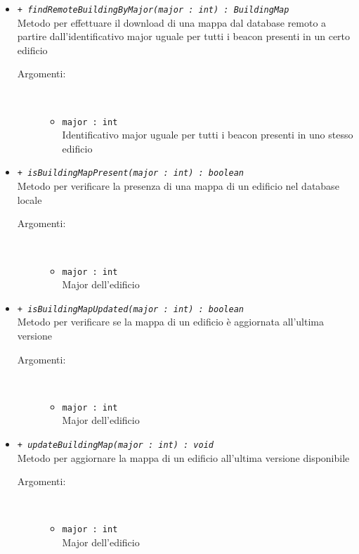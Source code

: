 \documentclass[../DefinizioneDiProdotto.tex]{subfiles}
\begin{document}
\begin{description}
\begin{itemize}
\begin{description}
\end{description}
\item \texttt{+ \textit{findRemoteBuildingByMajor(major : int) : BuildingMap}}\\
Metodo per effettuare il download di una mappa dal database remoto a partire dall'identificativo major uguale per tutti i beacon presenti in un certo edificio
 \begin{description}
\item[Argomenti:] \
\begin{itemize}
\item \texttt{major : int}\\
Identificativo major uguale per tutti i beacon presenti in uno stesso edificio\end{itemize}
\end{description}
\item \texttt{+ \textit{isBuildingMapPresent(major : int) : boolean}}\\
Metodo per verificare la presenza di una mappa di un edificio nel database locale
 \begin{description}
\item[Argomenti:] \
\begin{itemize}
\item \texttt{major : int}\\
Major dell'edificio\end{itemize}
\end{description}
\item \texttt{+ \textit{isBuildingMapUpdated(major : int) : boolean}}\\
Metodo per verificare se la mappa di un edificio è aggiornata all'ultima versione
 \begin{description}
\item[Argomenti:] \
\begin{itemize}
\item \texttt{major : int}\\
Major dell'edificio\end{itemize}
\end{description}
\item \texttt{+ \textit{updateBuildingMap(major : int) : void}}\\
Metodo per aggiornare la mappa di un edificio all'ultima versione disponibile
 \begin{description}
\item[Argomenti:] \
\begin{itemize}
\item \texttt{major : int}\\
Major dell'edificio\end{itemize}
\end{description}
\end{itemize}
\end{description}
\end{document}
